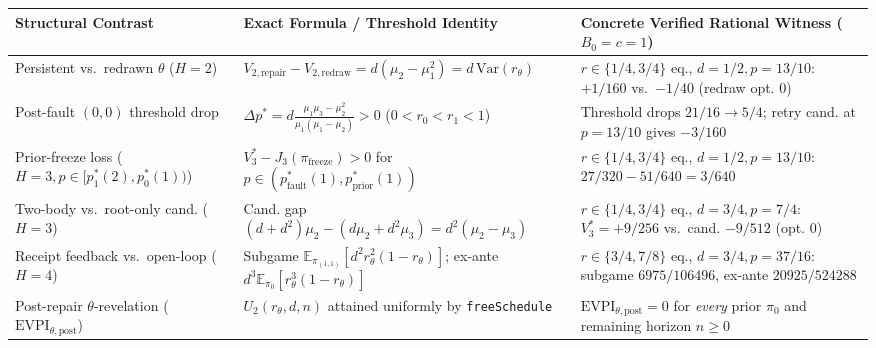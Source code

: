 \documentclass[11pt,a4paper]{article}
\newcounter{none}
\begin{document}
{\def\LTcaptype{none} %
\begin{longtable}[]{@{}
  >{\raggedright\arraybackslash}p{}
  >{\raggedright\arraybackslash}p{}
  >{\raggedright\arraybackslash}p{}@{}}
\toprule\noalign{}
\begin{minipage}[b]{\linewidth}\raggedright
Structural Contrast
\end{minipage} & \begin{minipage}[b]{\linewidth}\raggedright
Exact Formula / Threshold Identity
\end{minipage} & \begin{minipage}[b]{\linewidth}\raggedright
Concrete Verified Rational Witness (\(B_0 = c = 1\))
\end{minipage} \\
\midrule\noalign{}
\endhead
\bottomrule\noalign{}
\endlastfoot
Persistent vs.~redrawn \(\theta\) (\(H=2\)) &
\(V_{2,\mathrm{repair}} - V_{2,\mathrm{redraw}} = d(\mu_2 - \mu_1^2) = d\,\mathrm{Var}(r_\theta)\)
& \(r \in \{1/4, 3/4\}\) eq., \(d=1/2, p=13/10\): \(+1/160\)
vs.~\(-1/40\) (redraw opt. \(0\)) \\
Post-fault \((0,0)\) threshold drop &
\(\Delta p^* = d\frac{\mu_1\mu_3 - \mu_2^2}{\mu_1(\mu_1 - \mu_2)} > 0\)
(\(0 < r_0 < r_1 < 1\)) & Threshold drops \(21/16 \to 5/4\); retry cand.
at \(p=13/10\) gives \(-3/160\) \\
Prior-freeze loss (\(H=3, p \in [p_1^*(2), p_0^*(1))\)) &
\(V_3^* - J_3(\pi_{\mathrm{freeze}}) > 0\) for
\(p \in (p_{\mathrm{fault}}^*(1), p_{\mathrm{prior}}^*(1))\) &
\(r \in \{1/4, 3/4\}\) eq., \(d=1/2, p=13/10\):
\(27/320 - 51/640 = 3/640\) \\
Two-body vs.~root-only cand. (\(H=3\)) & Cand. gap
\((d + d^2)\mu_2 - (d\mu_2 + d^2\mu_3) = d^2(\mu_2 - \mu_3)\) &
\(r \in \{1/4, 3/4\}\) eq., \(d=3/4, p=7/4\): \(V_3^* = +9/256\)
vs.~cand. \(-9/512\) (opt. \(0\)) \\
Receipt feedback vs.~open-loop (\(H=4\)) & Subgame
\(\mathbb{E}_{\pi_{(1,1)}}[d^2 r_\theta^2(1 - r_\theta)]\); ex-ante
\(d^3\mathbb{E}_{\pi_0}[r_\theta^3(1 - r_\theta)]\) &
\(r \in \{3/4, 7/8\}\) eq., \(d=3/4, p=37/16\): subgame \(6975/106496\),
ex-ante \(20925/524288\) \\
Post-repair \(\theta\)-revelation
(\(\mathrm{EVPI}_{\theta,\mathrm{post}}\)) & \(U_2(r_\theta, d, n)\)
attained uniformly by \texttt{freeSchedule} &
\(\mathrm{EVPI}_{\theta,\mathrm{post}} = 0\) for \emph{every} prior
\(\pi_0\) and remaining horizon \(n \ge 0\) \\
\end{longtable}
}
\end{document}
